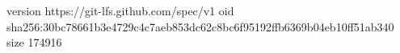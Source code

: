version https://git-lfs.github.com/spec/v1
oid sha256:30bc78661b3e4729c4c7aeb853dc62c8bc6f95192ffb6369b04eb10ff51ab340
size 174916
